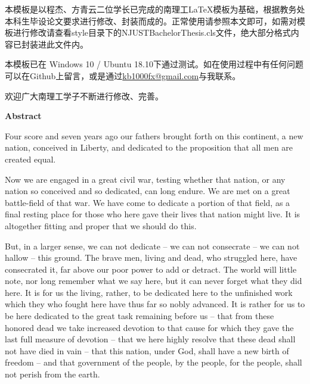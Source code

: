 \begin{NJUSTAbstractZH}	
	
\qquad 本模板是以程杰、方青云二位学长已完成的南理工\LaTeX 模板为基础，根据教务处本科生毕设论文要求进行修改、封装而成的。正常使用请参照本文即可，如需对模板进行修改请查看style目录下的NJUSTBachelorThesis.cls文件，绝大部分格式内容已封装进此文件内。	

\qquad 本模板已在 Windows 10 / Ubuntu 18.10下通过测试。如在使用过程中有任何问题可以在Github上留言，或是通过\url{kb1000fx@gmail.com}与我联系。

\qquad 欢迎广大南理工学子不断进行修改、完善。

\vspace{8ex}


\end{NJUSTAbstractZH}

\newpage

\begin{NJUSTAbstractEN}	
	

\textbf{\heiti{} Abstract}

	\quad Four score and seven years ago our fathers brought forth on this continent, a new nation, conceived in Liberty, and dedicated to the proposition that all men are created equal.
	
	Now we are engaged in a great civil war, testing whether that nation, or any nation so conceived and so dedicated, can long endure. We are met on a great battle-field of that war. We have come to dedicate a portion of that field, as a final resting place for those who here gave their lives that nation might live. It is altogether fitting and proper that we should do this.
	
	But, in a larger sense, we can not dedicate -- we can not consecrate -- we can not hallow -- this ground. The brave men, living and dead, who struggled here, have consecrated it, far above our poor power to add or detract. The world will little note, nor long remember what we say here, but it can never forget what they did here. It is for us the living, rather, to be dedicated here to the unfinished work which they who fought here have thus far so nobly advanced. It is rather for us to be here dedicated to the great task remaining before us -- that from these honored dead we take increased devotion to that cause for which they gave the last full measure of devotion -- that we here highly resolve that these dead shall not have died in vain -- that this nation, under God, shall have a new birth of freedom -- and that government of the people, by the people, for the people, shall not perish from the earth.
	\vspace{8ex}


\end{NJUSTAbstractEN}	


